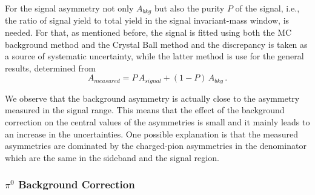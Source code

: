 For the signal asymmetry not only $A_{bkg}$ but also the purity \(P\) of the signal, i.e., the ratio of signal yield to total yield in the signal invariant-mass window, is needed. 
For that, as mentioned before, the signal is fitted using both the MC background method and the Crystal Ball method and the discrepancy is taken as a source of systematic uncertainty, while the latter method is use for the general results,
%
%
determined from  
\begin{equation}
A_{measured}=P\, A_{signal}+(1-P )\, A_{bkg} \, .
\label{eqn:bkgcorr}
\end{equation}


We observe that the background asymmetry is actually close to the asymmetry measured in the  signal range. This means that the effect of the background correction on the central values of the asymmetries is small and it mainly leads to an increase in the uncertainties. One possible explanation is that the measured asymmetries are dominated by the charged-pion asymmetries in the denominator which are the same in the sideband and the signal region.






\subsubsection{\texorpdfstring {$\pi^0$ Background Correction}{pi0 background correction}}
\label{sec:pi0bkgcorrection}

